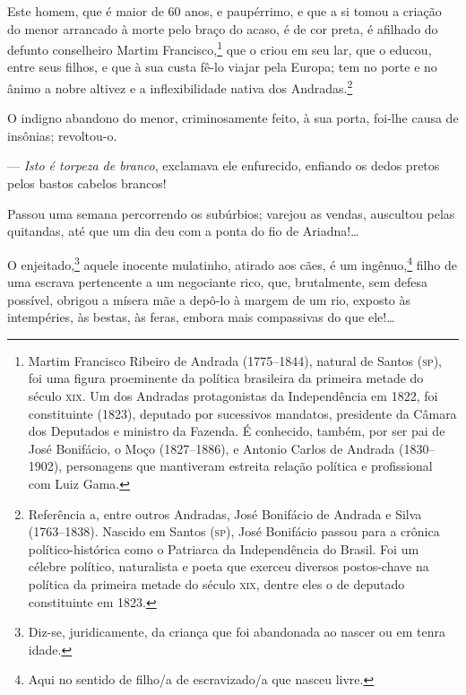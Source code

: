 Este homem, que é maior de 60 anos, e paupérrimo, e que a si tomou a
criação do menor arrancado à morte pelo braço do acaso, é de cor preta,
é afilhado do defunto conselheiro Martim Francisco,\footnote{Martim
  Francisco Ribeiro de Andrada (1775--1844), natural de Santos (\textsc{sp}), foi
  uma figura proeminente da política brasileira da primeira metade do
  século \textsc{xix}. Um dos Andradas protagonistas da Independência em 1822,
  foi constituinte (1823), deputado por sucessivos mandatos, presidente
  da Câmara dos Deputados e ministro da Fazenda. É conhecido, também,
  por ser pai de José Bonifácio, o Moço (1827--1886), e Antonio Carlos de
  Andrada (1830--1902), personagens que mantiveram estreita relação
  política e profissional com Luiz Gama.} que o criou em seu lar, que o
educou, entre seus filhos, e que à sua custa fê-lo viajar pela Europa;
tem no porte e no ânimo a nobre altivez e a inflexibilidade nativa dos
Andradas.\footnote{Referência a, entre outros Andradas, José Bonifácio
  de Andrada e Silva (1763--1838). Nascido em Santos (\textsc{sp}), José Bonifácio
  passou para a crônica político-histórica como o Patriarca da
  Independência do Brasil. Foi um célebre político, naturalista e poeta
  que exerceu diversos postos-chave na política da primeira metade do
  século \textsc{xix}, dentre eles o de deputado constituinte em 1823.}

O indigno abandono do menor, criminosamente feito, à sua porta, foi-lhe
causa de insônias; revoltou-o.

--- \emph{Isto é torpeza de branco}, exclamava ele enfurecido, enfiando
os dedos pretos pelos bastos cabelos brancos!

Passou uma semana percorrendo os subúrbios; varejou as vendas, auscultou
pelas quitandas, até que um dia deu com a ponta do fio de Ariadna!\ldots{}

O enjeitado,\footnote{Diz-se, juridicamente, da criança que foi
  abandonada ao nascer ou em tenra idade.} aquele inocente mulatinho,
atirado aos cães, é um ingênuo,\footnote{Aqui no sentido de filho/a de
  escravizado/a que nasceu livre.} filho de uma escrava pertencente a
um negociante rico, que, brutalmente, sem defesa possível, obrigou a
mísera mãe a depô-lo à margem de um rio, exposto às intempéries, às
bestas, às feras, embora mais compassivas do que ele!\ldots{}

